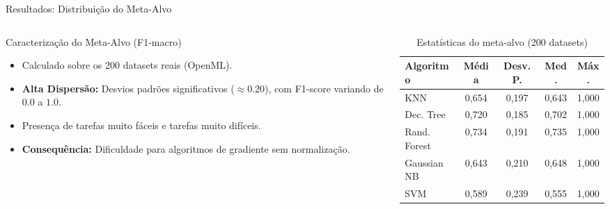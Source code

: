 \documentclass[aspectratio=169, 10pt]{beamer}
\begin{document}
\begin{frame}{Resultados: Distribuição do Meta-Alvo}
  \begin{columns}[T]
    \begin{column}{0.5\textwidth}
      \begin{block}{Caracterização do Meta-Alvo (F1-macro)}
        \small
        \begin{itemize}
          \item Calculado sobre os 200 datasets reais (OpenML).
          \item \textbf{Alta Dispersão:} Desvios padrões significativos ($\approx 0.20$), com F1-score variando de $0.0$ a $1.0$.
          \item Presença de tarefas muito fáceis e tarefas muito difíceis.
          \item \textbf{Consequência:} Dificuldade para algoritmos de gradiente sem normalização.
        \end{itemize}
      \end{block}
    \end{column}
    
    \begin{column}{0.48\textwidth}
      \small
      \begin{table}
        \centering
        \caption{Estatísticas do meta-alvo (200 datasets)}
        \begin{tabular}{lcccc}
          \toprule
          \textbf{Algoritmo} & \textbf{Média} & \textbf{Desv. P.} & \textbf{Med.} & \textbf{Máx.} \\
          \midrule
          KNN           & 0,654 & 0,197 & 0,643 & 1,000 \\
          Dec. Tree     & 0,720 & 0,185 & 0,702 & 1,000 \\
          Rand. Forest  & 0,734 & 0,191 & 0,735 & 1,000 \\
          Gaussian NB   & 0,643 & 0,210 & 0,648 & 1,000 \\
          SVM           & 0,589 & 0,239 & 0,555 & 1,000 \\
          \bottomrule
        \end{tabular}
      \end{table}
    \end{column}
  \end{columns}
\end{frame}
\end{document}
